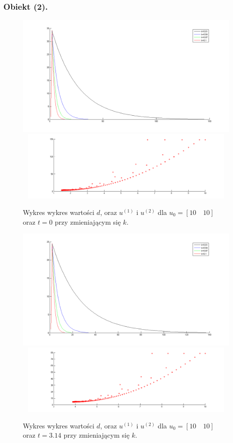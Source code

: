 \documentclass[a4paper,10pt]{article}
\begin{document}

\subsubsection{Obiekt (2).}





\begin{figure}[!h]
    \centering
	\includegraphics[width=120mm]{CW4-alg2fun2-u10_10-k001_01-t0-d.png}
	\includegraphics[width=120mm,height=35mm]{CW4-alg2fun2-u10_10-k001_01-t0-u.png}
	\caption{Wykres wykres wartości $d$, oraz $u^{(1)}$ i $u^{(2)}$ dla $u_0=[10 \quad 10]$ oraz $t=0$ przy zmieniającym się $k$.}
    \label{fig:Rysunek}
\end{figure}
\begin{figure}[!h]
    \centering
	\includegraphics[width=120mm]{CW4-alg2fun2-u10_10-k001_01-t314-d.png}
	\includegraphics[width=120mm,height=35mm]{CW4-alg2fun2-u10_10-k001_01-t314-u.png}
	\caption{Wykres wykres wartości $d$, oraz $u^{(1)}$ i $u^{(2)}$ dla $u_0=[10 \quad 10]$ oraz $t=3.14$ przy zmieniającym się $k$.}
    \label{fig:Rysunek}
\end{figure}
\end{document}
